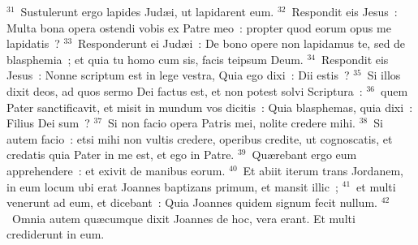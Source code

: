 ${}^{31}$~Sustulerunt ergo lapides Jud\ae i, ut lapidarent eum.
${}^{32}$~Respondit eis Jesus~: Multa bona opera ostendi vobis ex Patre meo~: propter quod eorum opus me lapidatis~?
${}^{33}$~Responderunt ei Jud\ae i~: De bono opere non lapidamus te, sed de blasphemia~; et quia tu homo cum sis, facis teipsum Deum.
${}^{34}$~Respondit eis Jesus~: Nonne scriptum est in lege vestra, Quia ego dixi~: Dii estis~?
${}^{35}$~Si illos dixit deos, ad quos sermo Dei factus est, et non potest solvi Scriptura~:
${}^{36}$~quem Pater sanctificavit, et misit in mundum vos dicitis~: Quia blasphemas, quia dixi~: Filius Dei sum~?
${}^{37}$~Si non facio opera Patris mei, nolite credere mihi.
${}^{38}$~Si autem facio~: etsi mihi non vultis credere, operibus credite, ut cognoscatis, et credatis quia Pater in me est, et ego in Patre.
${}^{39}$~Qu\ae rebant ergo eum apprehendere~: et exivit de manibus eorum.
${}^{40}$~Et abiit iterum trans Jordanem, in eum locum ubi erat Joannes baptizans primum, et mansit illic~;
${}^{41}$~et multi venerunt ad eum, et dicebant~: Quia Joannes quidem signum fecit nullum.
${}^{42}$~Omnia autem qu\ae cumque dixit Joannes de hoc, vera erant. Et multi crediderunt in eum.

